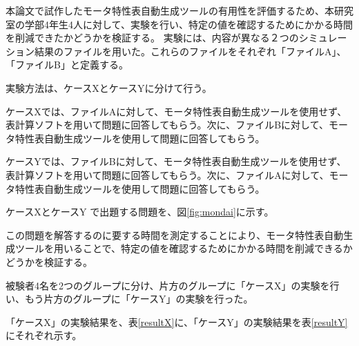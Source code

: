 本論文で試作したモータ特性表自動生成ツールの有用性を評価するため、本研究室の学部4年生4人に対して、実験を行い、特定の値を確認するためにかかる時間を削減できたかどうかを検証する。
実験には、内容が異なる２つのシミュレーション結果のファイルを用いた。これらのファイルをそれぞれ「ファイルA」、「ファイルB」と定義する。

実験方法は、ケースXとケースYに分けて行う。

ケースXでは、ファイルAに対して、モータ特性表自動生成ツールを使用せず、表計算ソフトを用いて問題に回答してもらう。次に、ファイルBに対して、モータ特性表自動生成ツールを使用して問題に回答してもらう。

ケースYでは、ファイルBに対して、モータ特性表自動生成ツールを使用せず、表計算ソフトを用いて問題に回答してもらう。次に、ファイルAに対して、モータ特性表自動生成ツールを使用して問題に回答してもらう。

ケースXとケースY で出題する問題を、図\ref{fig:mondai}に示す。

この問題を解答するのに要する時間を測定することにより、モータ特性表自動生成ツールを用いることで、特定の値を確認するためにかかる時間を削減できるかどうかを検証する。

被験者4名を2つのグループに分け、片方のグループに「ケースX」の実験を行い、もう片方のグループに「ケースY」の実験を行った。

「ケースX」の実験結果を、表\ref{resultX}に、「ケースY」の実験結果を表\ref{resultY}にそれぞれ示す。

